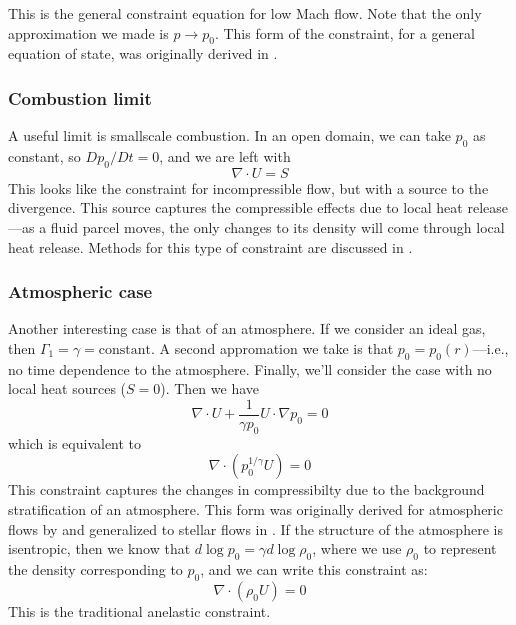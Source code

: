 This is the general constraint equation for low Mach flow.  Note that the
only approximation we made is $p \rightarrow p_0$.  This form of the constraint,
for a general equation of state, was originally derived in \cite{ABRZ:I}.  

\subsubsection{Combustion limit}

A useful limit is smallscale combustion.  In an open domain, we can take
$p_0$ as constant, so $Dp_0/Dt = 0$, and we are left with
\begin{equation}
\nabla \cdot U = S
\end{equation}
This looks like the constraint for incompressible flow, but with a source
to the divergence.  This source captures the compressible effects due
to local heat release---as a fluid parcel moves, the only changes to
its density will come through local heat release.  Methods for this
type of constraint are discussed in \cite{pember-flame,DayBell:2004,SNpaper}.

\subsubsection{Atmospheric case}

Another interesting case is that of an atmosphere.  If we consider an
ideal gas, then $\Gamma_1 = \gamma = \mathrm{constant}$.  A second
appromation we take is that $p_0 = p_0(r)$---i.e., no time
dependence to the atmosphere.  Finally, we'll consider the case
with no local heat sources ($S = 0$).  Then we have
\begin{equation}
\nabla \cdot U + \frac{1}{\gamma p_0} U \cdot \nabla p_0 = 0
\end{equation}
which is equivalent to
\begin{equation}
\nabla \cdot \left ( p_0^{1/\gamma} U \right ) = 0
\end{equation}
This constraint captures the changes in compressibilty due to the 
background stratification of an atmosphere.  This form was originally
derived for atmospheric flows by \cite{durran:1989} and generalized to
stellar flows in \cite{ABRZ:I}.  If the structure of the
atmosphere is isentropic, then we know that $d\log p_0 = \gamma d\log \rho_0$,
where we use $\rho_0$ to represent the density corresponding to $p_0$, and
we can write this constraint as:
\begin{equation}
\nabla \cdot (\rho_0 U) = 0
\end{equation}
This is the traditional anelastic constraint.


